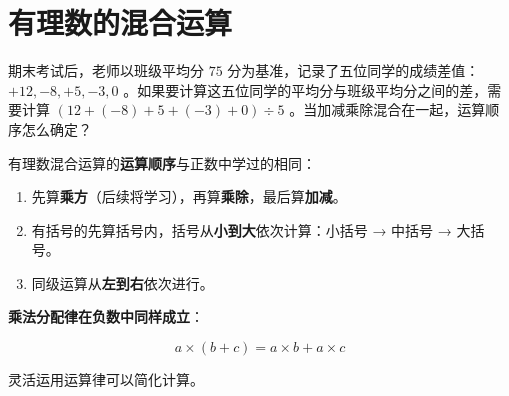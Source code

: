 \section*{有理数的混合运算}


\begin{explore}


期末考试后，老师以班级平均分 $75$ 分为基准，记录了五位同学的成绩差值： $+12, -8, +5, -3, 0$ 。如果要计算这五位同学的平均分与班级平均分之间的差，需要计算 $(12 + (-8) + 5 + (-3) + 0) \div 5$ 。当加减乘除混合在一起，运算顺序怎么确定？

\end{explore}

\begin{understand}


有理数混合运算的\textbf{运算顺序}与正数中学过的相同：

\begin{enumerate}
  \item 先算\textbf{乘方}（后续将学习），再算\textbf{乘除}，最后算\textbf{加减}。
  \item 有括号的先算括号内，括号从\textbf{小到大}依次计算：小括号 → 中括号 → 大括号。
  \item 同级运算从\textbf{左到右}依次进行。
\end{enumerate}


\textbf{乘法分配律在负数中同样成立}：

\[
a \times (b + c) = a \times b + a \times c
\]


灵活运用运算律可以简化计算。

\end{understand}

